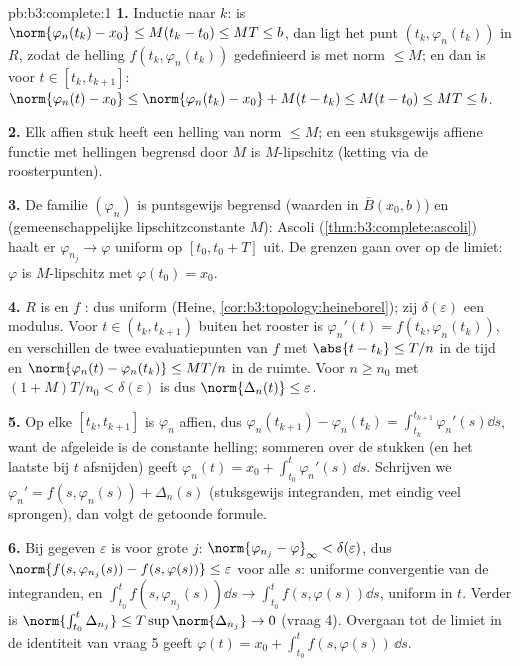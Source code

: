 \begin{solution}{pb:b3:complete:1}
\textbf{1.} Inductie naar $k$: is $\norm{\varphi_n(t_k) - x_0}
\leq M(t_k - t_0) \leq MT \leq b$, dan ligt het punt $(t_k,
\varphi_n(t_k))$ in $R$, zodat de helling $f(t_k,
\varphi_n(t_k))$ gedefinieerd is met norm $\leq M$; en dan is voor
$t \in [t_k, t_{k+1}]$: $\norm{\varphi_n(t) - x_0} \leq
\norm{\varphi_n(t_k) - x_0} + M(t - t_k) \leq M(t - t_0) \leq MT
\leq b$.

\textbf{2.} Elk affien stuk heeft een helling van norm $\leq M$;
en een stuksgewijs affiene functie met hellingen begrensd door $M$
is $M$-lipschitz (ketting via de roosterpunten).

\textbf{3.} De familie $(\varphi_n)$ is puntsgewijs begrensd
(waarden in $\bar B(x_0, b)$) en  (gemeenschappelijke
lipschitzconstante $M$): Ascoli
(\cref{thm:b3:complete:ascoli}) haalt er $\varphi_{n_j} \to
\varphi$ uniform op $[t_0, t_0 + T]$ uit. De grenzen gaan over op
de limiet: $\varphi$ is $M$-lipschitz met $\varphi(t_0) = x_0$.

\textbf{4.} $R$ is  en $f$ : dus uniform 
(Heine, \cref{cor:b3:topology:heineborel}); zij
$\delta(\varepsilon)$ een modulus. Voor $t \in (t_k, t_{k+1})$
buiten het rooster is $\varphi_n'(t) = f(t_k, \varphi_n(t_k))$, en
verschillen de twee evaluatiepunten van $f$ met $\abs{t - t_k}
\leq T/n$ in de tijd en $\norm{\varphi_n(t) - \varphi_n(t_k)} \leq
MT/n$ in de ruimte. Voor $n \geq n_0$ met $(1 + M)T/n_0 <
\delta(\varepsilon)$ is dus $\norm{\Delta_n(t)} \leq
\varepsilon$.

\textbf{5.} Op elke $[t_k, t_{k+1}]$ is $\varphi_n$ affien, dus
$\varphi_n(t_{k+1}) - \varphi_n(t_k) = \int_{t_k}^{t_{k+1}}
\varphi_n'(s)\dd s$, want de afgeleide is de constante helling;
sommeren over de stukken (en het laatste bij $t$ afsnijden) geeft
$\varphi_n(t) = x_0 + \int_{t_0}^t\varphi_n'(s)\,\dd s$. Schrijven
we $\varphi_n' = f(s, \varphi_n(s)) + \Delta_n(s)$ (stuksgewijs
 integranden, met eindig veel sprongen), dan volgt de
getoonde formule.

\textbf{6.} Bij gegeven $\varepsilon$ is voor grote $j$:
$\norm{\varphi_{n_j} - \varphi}_\infty < \delta(\varepsilon)$,
dus $\norm{f(s, \varphi_{n_j}(s)) - f(s, \varphi(s))} \leq
\varepsilon$ voor alle $s$: uniforme convergentie van de
integranden, en $\int_{t_0}^t f(s,\varphi_{n_j}(s))\dd s \to
\int_{t_0}^tf(s, \varphi(s))\dd s$, uniform in $t$. Verder is
$\norm{\int_{t_0}^t\Delta_{n_j}} \leq T\sup\norm{\Delta_{n_j}} \to
0$ (vraag 4). Overgaan tot de limiet in de identiteit van vraag 5
geeft $\varphi(t) = x_0 + \int_{t_0}^tf(s, \varphi(s))\,\dd s$.


\end{solution}
